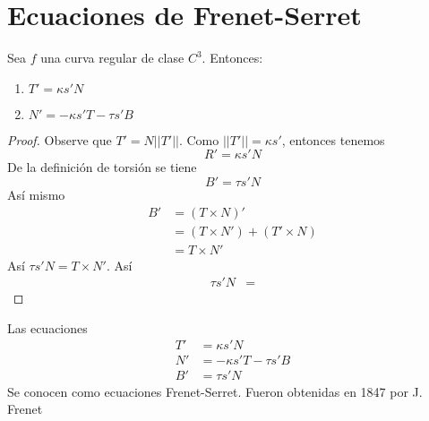 \section{Ecuaciones de Frenet-Serret}
\begin{proposition}
 Sea $f$ una curva regular de clase $C^3$. Entonces:
 \begin{enumerate}
   \item $T' = \kappa s' N$ \\
   \item $N' = -\kappa s' T - \tau s'B$
 \end{enumerate}
\end{proposition}
\begin{proof}
 Observe que $T' = N ||T'||$. Como $||T'|| = \kappa s'$, entonces tenemos 
 \[
   R' =\kappa s' N
 \]
 De la definición de torsión se tiene
 \[
   B' = \tau s' N
 \]
 Así mismo
 \begin{align*}
   B' &= (T \times N)' \\
      &= (T \times N') + (T' \times N ) \\
      &= T \times N'
 \end{align*}
 Así $\tau s' N = T \times N'$. Así
 \begin{align*}
   \tau s' N &=  
 \end{align*}
\end{proof}
Las ecuaciones
\begin{align*}
  T'&= \kappa s' N \\
 N' &= -\kappa s' T - \tau s' B \\
 B' &=\tau s' N
\end{align*}
Se conocen como ecuaciones Frenet-Serret. Fueron obtenidas en 1847 por J. Frenet

